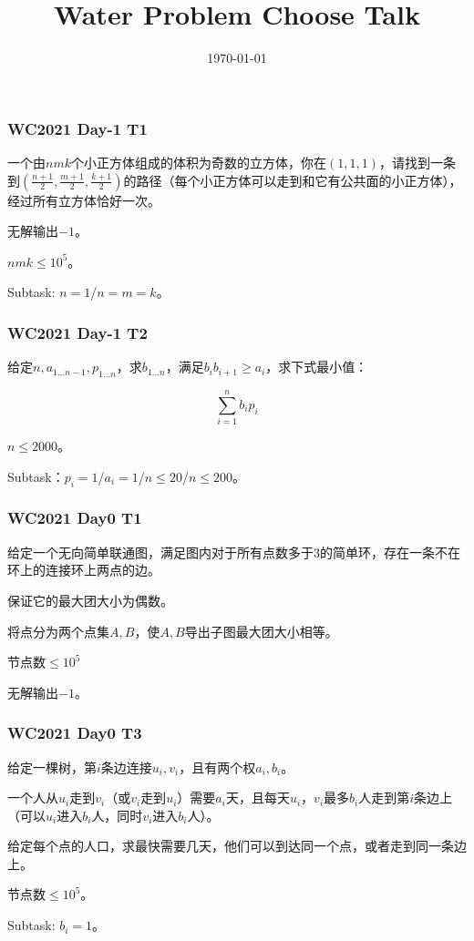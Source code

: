 \documentclass[10pt]{beamer}
\begin{document}
\title{Water Problem Choose Talk}
\date{\today}
\maketitle
\clearpage

\begin{frame}
	\frametitle{WC2021 Day-1 T1}

	一个由$nmk$个小正方体组成的体积为奇数的立方体，你在$(1,1,1)$，请找到一条到$(\frac{n+1}2,\frac{m+1}2,\frac{k+1}2)$的路径（每个小正方体可以走到和它有公共面的小正方体），经过所有立方体恰好一次。

	无解输出$-1$。

	$nmk\le 10^5$。

	Subtask: $n=1$/$n=m=k$。
\end{frame}
\clearpage
\begin{frame}
	\frametitle{WC2021 Day-1 T2}

	给定$n,a_{1\dots n-1},p_{1\dots n}$，求$b_{1\dots n}$，满足$b_ib_{i+1}\ge a_i$，求下式最小值：

	$$
	\sum_{i=1}^n b_ip_i
	$$

	$n\le 2000$。

	Subtask：$p_i=1$/$a_i=1$/$n\le 20$/$n\le 200$。
\end{frame}
\clearpage
\begin{frame}
	\frametitle{WC2021 Day0 T1}

	给定一个无向简单联通图，满足图内对于所有点数多于$3$的简单环，存在一条不在环上的连接环上两点的边。

	保证它的最大团大小为偶数。
	
	将点分为两个点集$A,B$，使$A,B$导出子图最大团大小相等。

	节点数$\le 10^5$

	无解输出$-1$。
\end{frame}
\clearpage

\begin{frame}
	\frametitle{WC2021 Day0 T3}

	给定一棵树，第$i$条边连接$u_i,v_i$，且有两个权$a_i,b_i$。

	一个人从$u_i$走到$v_i$（或$v_i$走到$u_i$）需要$a_i$天，且每天$u_i$，$v_i$最多$b_i$人走到第$i$条边上（可以$u_i$进入$b_i$人，同时$v_i$进入$b_i$人）。

	给定每个点的人口，求最快需要几天，他们可以到达同一个点，或者走到同一条边上。

	节点数$\le 10^5$。

	Subtask: $b_i=1$。

\end{frame}
\clearpage
\end{document}
